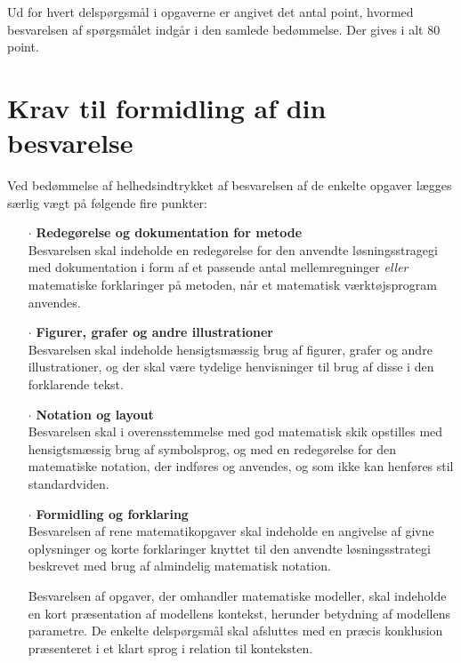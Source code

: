 \documentclass[12pt,x11names,a4paper]{article}
\begin{document}



Ud for hvert delspørgsmål i opgaverne er angivet det antal point, hvormed besvarelsen af spørgsmålet indgår i den samlede bedømmelse. Der gives i alt 80 point. 

\section*{Krav til formidling af din besvarelse}

Ved bedømmelse af helhedsindtrykket af besvarelsen af de enkelte opgaver lægges særlig vægt på følgende fire punkter:
\begin{itemize}
\item[$\cdot$] \textbf{Redegørelse og dokumentation for metode} \\
Besvarelsen skal indeholde en redegørelse for den anvendte løsningsstragegi med dokumentation i form af et passende antal mellemregninger \textit{eller} matematiske forklaringer på metoden, når et matematisk værktøjsprogram anvendes.
\item[$\cdot$] \textbf{Figurer, grafer og andre illustrationer} \\
Besvarelsen skal indeholde hensigtsmæssig brug af figurer, grafer og andre illustrationer, og der skal være tydelige henvisninger til brug af disse i den forklarende tekst.
\item[$\cdot$] \textbf{Notation og layout}\\
Besvarelsen skal i overensstemmelse med god matematisk skik opstilles med hensigtsmæssig brug af symbolsprog, og med en redegørelse for den matematiske notation, der indføres og anvendes, og som ikke kan henføres stil standardviden.
\item[$\cdot$] \textbf{Formidling og forklaring}\\
Besvarelsen af rene matematikopgaver skal indeholde en angivelse af givne oplysninger og korte forklaringer knyttet til den anvendte løsningsstrategi beskrevet med brug af almindelig matematisk notation. 

Besvarelsen af opgaver, der omhandler matematiske modeller, skal indeholde en kort præsentation af modellens kontekst, herunder betydning af modellens parametre. De enkelte delspørgsmål skal afsluttes med en præcis konklusion præsenteret i et klart sprog i relation til konteksten.
\end{itemize}
\end{document}
